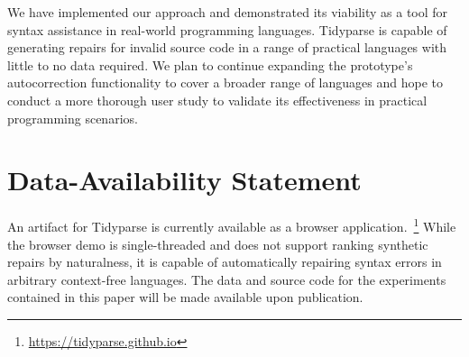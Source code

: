 \documentclass[sigplan,acmsmall,nonacm,screen]{acmart}\settopmatter{printfolios=false,printccs=false,printacmref=false}
\begin{document}

  We have implemented our approach and demonstrated its viability as a tool for syntax assistance in real-world programming languages. Tidyparse is capable of generating repairs for invalid source code in a range of practical languages with little to no data required. We plan to continue expanding the prototype's autocorrection functionality to cover a broader range of languages and hope to conduct a more thorough user study to validate its effectiveness in practical programming scenarios.

  \section*{Data-Availability Statement}

  An artifact for Tidyparse is currently available as a browser application.~\footnote{\url{https://tidyparse.github.io}} While the browser demo is single-threaded and does not support ranking synthetic repairs by naturalness, it is capable of automatically repairing syntax errors in arbitrary context-free languages. The data and source code for the experiments contained in this paper will be made available upon publication.

%

%
\end{document}
